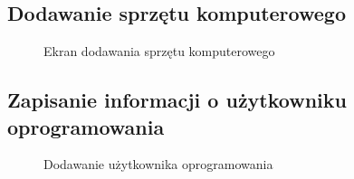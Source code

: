 \subsection{Dodawanie sprzętu komputerowego}
\begin{figure}[H]
	\centering
        \vfill
        \noindent
	\caption{Ekran dodawania sprzętu komputerowego}
\end{figure}

\subsection{Zapisanie informacji o użytkowniku oprogramowania}
\begin{figure}[H]
	\centering
        \vfill
        \noindent
	\caption{Dodawanie użytkownika oprogramowania}
\end{figure}

